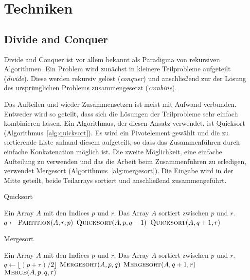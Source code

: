 \section{Techniken}

\subsection{Divide and Conquer}
\label{divide}
Divide and Conquer ist vor allem bekannt als Paradigma von rekursiven
Algorithmen.
Ein Problem wird zunächst in kleinere Teilprobleme aufgeteilt (\emph{divide}).
Diese werden rekursiv gelöst (\emph{conquer}) und anschließend zur der Lösung
des ursprünglichen Problems zusammengesetzt (\emph{combine}).

Das Aufteilen und wieder Zusammensetzen ist meist mit Aufwand verbunden.
Entweder wird so geteilt, dass sich die Lösungen der Teilprobleme sehr einfach
kombinieren lassen. Ein Algorithmus, der diesen Ansatz verwendet, ist
Quicksort (Algorithmus~\ref{alg:quicksort}).
Es wird ein Pivotelement gewählt und die zu sortierende Liste anhand diesem
aufgeteilt, so dass das Zusammenführen durch einfache Konkatenation möglich
ist.
Die zweite Möglichkeit, eine einfache Aufteilung zu verwenden und das
die Arbeit beim Zusammenführen zu erledigen, verwendet Mergesort
(Algorithmus~\ref{alg:mergesort}).
Die Eingabe wird in der Mitte geteilt, beide Teilarrays sortiert und
anschließend zusammengeführt.

\begin{algorithm}
    \caption{Quicksort \cite[S.171]{cormen}}
    \label{alg:quicksort}
    \begin{algorithmic}[1]
    \Require Ein Array $A$ mit den Indices $p$ und $r$.
    \Ensure Das Array $A$ sortiert zwischen $p$ und $r$.
        \State $q \gets \textsc{Partition}(A,r,p)$
        \State $\textsc{Quicksort}(A, p, q - 1)$
        \State $\textsc{Quicksort}(A, q + 1, r)$
    \EndIf
    \end{algorithmic}
\end{algorithm}

\begin{algorithm}
    \caption{Mergesort \cite[S.34]{cormen}}
    \label{alg:mergesort}
    \begin{algorithmic}[1]
    \Require Ein Array $A$ mit den Indices $p$ und $r$.
    \Ensure Das Array $A$ sortiert zwischen $p$ und $r$.
        \State $q \gets \lfloor (p + r) / 2 \rfloor$
        \State $\textsc{Mergesort}(A, p, q)$
        \State $\textsc{Mergesort}(A, q + 1, r)$
        \State $\textsc{Merge}(A, p, q, r)$
    \EndIf
    \end{algorithmic}
\end{algorithm}

